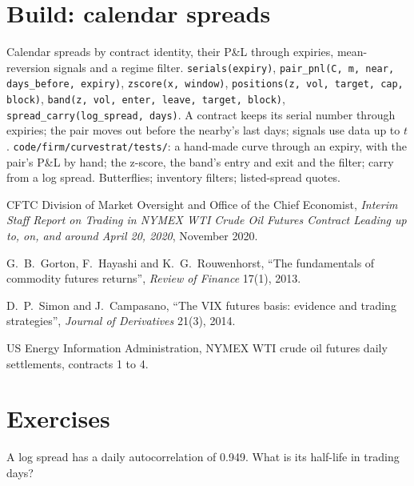 \section{Build: calendar spreads}\label{bld:s1:calendar-spreads-and-curve-trades:curvestrat}

\begin{build}
 Calendar spreads by contract identity, their P\&L through expiries, mean-reversion signals and a regime filter.
 \texttt{serials(expiry)}, \texttt{pair\_pnl(C, m, near, days\_before, expiry)}, \texttt{zscore(x, window)}, \texttt{positions(z, vol,
target, cap, block)}, \texttt{band(z, vol, enter, leave, target, block)}, \texttt{spread\_carry(log\_spread, days)}.
 A contract keeps its serial number through expiries; the pair moves out before the nearby's last days; signals use data up to $t$.
 \texttt{code/firm/curvestrat/tests/}: a hand-made curve through an expiry, with the pair's P\&L by hand; the z-score, the band's
entry and exit and the filter; carry from a log spread.
 Butterflies; inventory filters; listed-spread quotes.
\end{build}

\begin{omsources}
\item CFTC Division of Market Oversight and Office of the Chief Economist, \emph{Interim Staff Report on Trading in NYMEX WTI Crude Oil Futures Contract
Leading up to, on, and around April 20, 2020}, November 2020.
\item G.~B.~Gorton, F.~Hayashi and K.~G.~Rouwenhorst, ``The fundamentals of commodity futures returns'', \emph{Review of Finance} 17(1), 2013.
\item D.~P.~Simon and J.~Campasano, ``The VIX futures basis: evidence and trading strategies'', \emph{Journal of Derivatives} 21(3), 2014.
\item US Energy Information Administration, NYMEX WTI crude oil futures daily settlements, contracts 1 to 4.
\end{omsources}

\section{Exercises}

\begin{exercise}[$\star$]\label{exo:s1:calendar-spreads-and-curve-trades:1}
A log spread has a daily autocorrelation of 0.949. What is its half-life in trading days?
\end{exercise}

